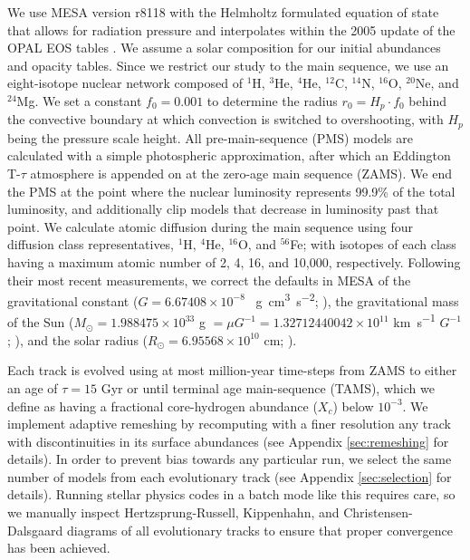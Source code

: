 \documentclass[manuscript]{aastex}
\begin{document}
We use MESA version r8118 with the Helmholtz formulated equation of state that allows for radiation pressure and interpolates within the 2005 update of the OPAL EOS tables \citep{2002ApJ...576.1064R}. We assume a \citet{1998SSRv...85..161G} solar composition for our initial abundances and opacity tables. Since we restrict our study to the main sequence, we use an eight-isotope nuclear network composed of $^1$H, $^3$He, $^4$He, $^{12}$C, $^{14}$N, $^{16}$O, $^{20}$Ne, and $^{24}$Mg. We set a constant $f_0 = 0.001$ to determine the radius $r_0 = H_p \cdot f_0$ behind the convective boundary at which convection is switched to overshooting, with $H_p$ being the pressure scale height. All pre-main-sequence (PMS) models are calculated with a simple photospheric approximation, after which an Eddington T-$\tau$ atmosphere is appended on at the zero-age main sequence (ZAMS). We end the PMS at the point where the nuclear luminosity represents 99.9\% of the total luminosity, and additionally clip models that decrease in luminosity past that point. We calculate atomic diffusion during the main sequence using four diffusion class representatives, $^1$H, $^4$He, $^{16}$O, and $^{56}$Fe; with isotopes of each class having a maximum atomic number of 2, 4, 16, and 10,000, respectively. Following their most recent measurements, we correct the defaults in MESA of the gravitational constant ($G=6.67408\times 10^{-8}$ \si{\per\g\cm\cubed\per\square\s}; \citealt{2015arXiv150707956M}), the gravitational mass of the Sun ($M_\odot = 1.988475\times 10^{33}$ \si{\g} $= \mu G^{-1} = 1.32712440042\times 10^{11}$ \si{\km\per\s} $G^{-1}$; \citealt{pitjeva2015determination}), and the solar radius ($R_\odot = 6.95568\times 10^{10}$ \si{\cm}; \citealt{2008ApJ...675L..53H}). 

Each track is evolved using at most million-year time-steps from ZAMS to either an age of $\tau=15$ Gyr or until terminal age main-sequence (TAMS), which we define as having a fractional core-hydrogen abundance ($X_c$) below $10^{-3}$. We implement adaptive remeshing by recomputing with a finer resolution any track with discontinuities in its surface abundances (see Appendix \ref{sec:remeshing} for details). In order to prevent bias towards any particular run, we select the same number of models from each evolutionary track (see Appendix \ref{sec:selection} for details). Running stellar physics codes in a batch mode like this requires care, so we manually inspect Hertzsprung-Russell, Kippenhahn, and Christensen-Dalsgaard diagrams of all evolutionary tracks to ensure that proper convergence has been achieved. %
\end{document}

